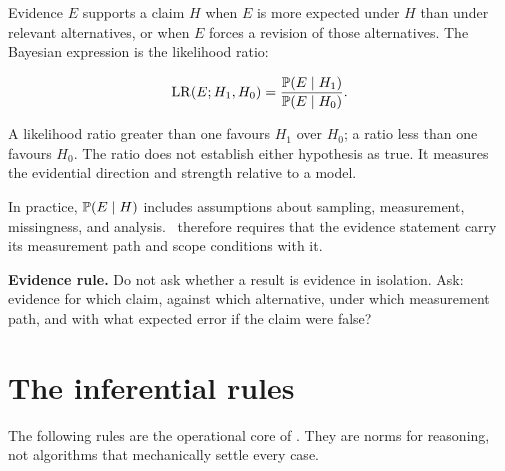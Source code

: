Evidence \(E\) supports a claim \(H\) when \(E\) is more expected under \(H\)
than under relevant alternatives, or when \(E\) forces a revision of those
alternatives. The Bayesian expression is the likelihood ratio:

\[
  \operatorname{LR}(E;H_1,H_0)
  =
  \frac{\mathbb{P}(E\mid H_1)}{\mathbb{P}(E\mid H_0)}.
\]

A likelihood ratio greater than one favours \(H_1\) over \(H_0\); a ratio less
than one favours \(H_0\). The ratio does not establish either hypothesis as
true. It measures the evidential direction and strength relative to a model.

In practice, \(\mathbb{P}(E\mid H)\) includes assumptions about sampling,
measurement, missingness, and analysis. \RCR\ therefore requires that the
evidence statement carry its measurement path and scope conditions with it.

\begin{principlebox}
\textbf{Evidence rule.} Do not ask whether a result is evidence in isolation.
Ask: evidence for which claim, against which alternative, under which
measurement path, and with what expected error if the claim were false?
\end{principlebox}

\section{The inferential rules}

The following rules are the operational core of \RCR. They are norms for
reasoning, not algorithms that mechanically settle every case.

